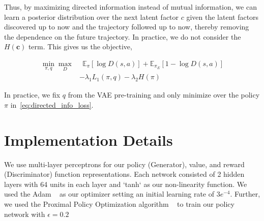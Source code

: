 \documentclass{article} %
\begin{document}
Thus, by maximizing directed information instead of mutual information, we can learn a posterior distribution over the next latent factor $c$ given the latent factors discovered up to now and the trajectory followed up to now, thereby removing the dependence on the future trajectory. In practice, we do not consider the $H(\boldsymbol{c})$ term. This gives us the objective,

\begin{align}
    \min_{\pi, q} \max_{D} & ~~\mathbb{E}_{\pi} [\log D(s,a)] + \mathbb{E}_{\pi_E} [1-\log D(s,a)] \nonumber\\
    & -\lambda_{1}L_{1}(\pi, q) - \lambda_{2}H(\pi)
\label{eq:directed_info_loss}
\end{align}

In practice, we fix $q$ from the VAE pre-training and only minimize over the policy $\pi$ in~\eqref{eq:directed_info_loss}.

\section{Implementation Details}
We use multi-layer perceptrons for our policy (Generator), value, and reward (Discriminator) function representations. Each network consisted of 2 hidden layers with 64 units in each layer and `tanh` as our non-linearity function. We used the Adam ~\cite{kingma2014adam} as our optimizer setting an initial learning rate of $3e^{-4}$. 
Further, we used the Proximal Policy Optimization algorithm ~\cite{schulman2017proximal} to train our policy network with $\epsilon = 0.2$
\end{document}
